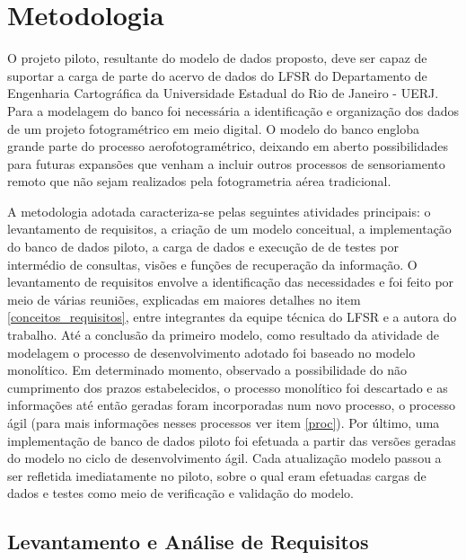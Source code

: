 \chapter{Metodologia} \label{met}

O projeto piloto, resultante do modelo de dados proposto, deve ser capaz de suportar a carga de parte do acervo de dados do LFSR do Departamento de Engenharia Cartográfica da Universidade Estadual do Rio de Janeiro - UERJ. Para a modelagem do banco foi necessária a identificação e organização dos dados de um projeto fotogramétrico em meio digital. O modelo do banco engloba grande parte do processo aerofotogramétrico, deixando em aberto possibilidades para futuras expansões que venham a incluir outros processos de sensoriamento remoto que não sejam realizados pela fotogrametria aérea tradicional.

A metodologia adotada caracteriza-se pelas seguintes atividades principais: o levantamento de requisitos, a criação de um modelo conceitual, a implementação do banco de dados piloto, a carga de dados e execução de de testes por intermédio de consultas, visões e funções de recuperação da informação. O levantamento de requisitos envolve a identificação das necessidades e foi feito por meio de várias reuniões, explicadas em maiores detalhes no item \ref{conceitos_requisitos}, entre integrantes da equipe técnica do LFSR e a autora do trabalho. Até a conclusão da primeiro modelo, como resultado da atividade de modelagem o processo de desenvolvimento adotado foi baseado no modelo monolítico. Em determinado momento, observado a possibilidade do não cumprimento dos prazos estabelecidos, o processo monolítico foi descartado e as informações até então geradas foram incorporadas num novo processo, o processo ágil (para mais informações nesses processos ver item \ref{proc}). Por último, uma implementação de banco de dados piloto foi efetuada a partir das versões geradas do modelo no ciclo de desenvolvimento ágil. Cada atualização modelo passou a ser refletida imediatamente no piloto, sobre o qual eram efetuadas cargas de dados e testes como meio de verificação e validação do modelo.



\section{Levantamento e Análise de Requisitos}

